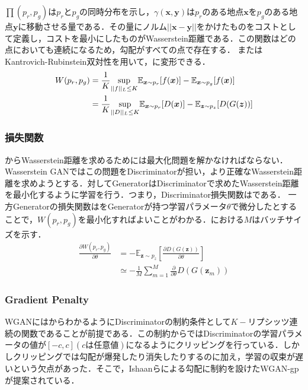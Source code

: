 $\prod(p_r, p_g)$は$p_r$と$p_g$の同時分布を示し，$\gamma(\bm x, \bm y)$は$p_r$のある地点$\bm x$を$p_g$のある地点$\bm y$に移動させる量である．その量にノルム$||\bm x - \bm y||$をかけたものをコストとして定義し，コストを最小にしたものがWasserstein距離である．この関数はどの点においても連続になるため，勾配がすべての点で存在する．
またはKantrovich-Rubinstein双対性を用いて，に変形できる．
\begin{align}
	W(p_r, p_g) &= \frac{1}{K}\underset{||f||_L \leq K}{\rm sup} \mathbb E_{\bm x \sim p_r}[f(\bm x)] - \mathbb E_{\bm x \sim p_g}[f(\bm x)] \nonumber \\
	&= \frac{1}{K}\underset{||D||_L \leq K}{\rm sup} \mathbb E_{\bm x \sim p_r}[D(\bm x)] - \mathbb E_{\bm z \sim p_z}[D(G(\bm z))] \label{eq:wasserstein2}
\end{align}
 

\subsubsection{損失関数}
 からWasserstein距離を求めるためには最大化問題を解かなければならない．Wasserstein GANではこの問題をDiscriminatorが担い，より正確なWasserstein距離を求めようとする．対してGeneratorはDiscriminatorで求めたWasserstein距離を最小化するように学習を行う．つまり，Discriminator損失関数はである．
一方Generatorの損失関数はをGeneratorが持つ学習パラメータ$\theta$で微分したとすることで，$W(p_r, p_g)$を最小化すればよいことがわかる．における$M$はバッチサイズを示す．
\newpage
\begin{align}
 	\frac{\partial W(p_r, p_g)}{\partial \theta} &= - \mathbb E_{\bm z \sim p_z}[\frac{\partial D(G(\bm z))}{\partial \theta}]\nonumber \\
 	&\simeq -\frac{1}{M} \sum_{m=1}^{M}\frac{\partial}{\partial \theta}D(G(\bm z_m)) \label{eq:wasserstein3}
\end{align}


\subsubsection{Gradient Penalty}
WGANにはからわかるようにDiscriminatorの制約条件として$K-$リプシッツ連続の関数であることが前提である．この制約から\cite{wgan}ではDiscriminatorの学習パラメータの値が$[-c, c](cは任意値)$になるようにクリッピングを行っている．しかしクリッピングでは勾配が爆発したり消失したりするのに加え，学習の収束が遅いという欠点があった．そこで，Ishaanらによる勾配に制約を設けたWGAN-gpが提案されている\cite{wgan-gp}．

